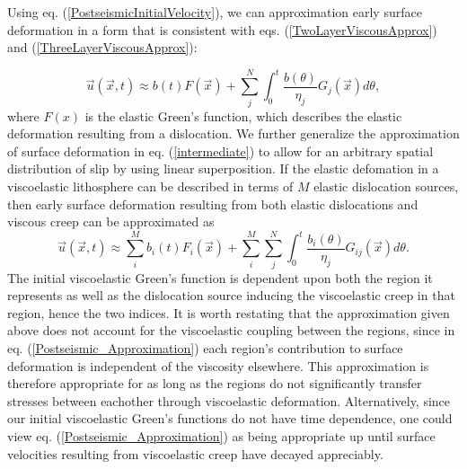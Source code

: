 \documentclass[extra]{gji}
\begin{document}
Using eq. (\ref{PostseismicInitialVelocity}), we can approximation
early surface deformation in a form that is consistent with
eqs. (\ref{TwoLayerViscousApprox}) and
(\ref{ThreeLayerViscousApprox}):

\begin{equation}\label{intermediate}
\vec{u}(\vec{x},t) \approx b(t)F(\vec{x}) + \sum_j^N\int_0^t
\frac{b(\theta)}{\eta_j}G_j(\vec{x}) d\theta,
\end{equation}
where $F(x)$ is the elastic Green's function, which describes the
elastic deformation resulting from a dislocation.  We further
generalize the approximation of surface deformation in
eq. (\ref{intermediate}) to allow for an arbitrary spatial
distribution of slip by using linear superposition.  If the elastic
defomation in a viscoelastic lithosphere can be described in terms of
$M$ elastic dislocation sources, then early surface deformation
resulting from both elastic dislocations and viscous creep can be
approximated as 
\begin{equation}\label{Postseismic_Approximation}
\vec{u}(\vec{x},t) \approx \sum_i^Mb_i(t)F_i(\vec{x}) +
\sum_i^M\sum_j^N\int_0^t\frac{b_i(\theta)}{\eta_j}G_{ij}(\vec{x}) d\theta.
\end{equation}
The initial viscoelastic Green's function is dependent upon both the
region it represents as well as the dislocation source inducing the
viscoelastic creep in that region, hence the two indices.  It is worth
restating that the approximation given above does not account for the
viscoelastic coupling between the regions, since in
eq. (\ref{Postseismic_Approximation}) each region's contribution to
surface deformation is independent of the viscosity elsewhere.  This
approximation is therefore appropriate for as long as the regions do
not significantly transfer stresses between eachother through
viscoelastic deformation.  Alternatively, since our initial
viscoelastic Green's functions do not have time dependence, one could
view eq. (\ref{Postseismic_Approximation}) as being appropriate up
until surface velocities resulting from viscoelastic creep have
decayed appreciably.
\end{document}
